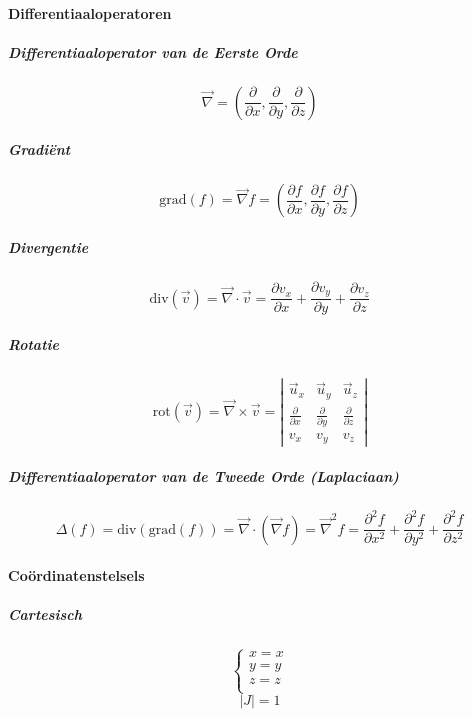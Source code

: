 \paragraph{Differentiaaloperatoren}
\label{sec:Differentiaaloperatoren}

\subparagraph{Differentiaaloperator van de Eerste Orde}
\label{sec:Differentiaaloperator1}
  \[
    \vec \nabla = \left(\frac{\partial}{\partial x},\frac{\partial}{\partial y},\frac{\partial}{\partial z}\right)
  \]

\subparagraph{Gradiënt}
\label{sec:Gradient}
  \[
    \mbox{grad}\left(f\right) = \vec \nabla f =  \left(\frac{\partial f}{\partial x},\frac{\partial f}{\partial y},\frac{\partial f}{\partial z}\right)
  \]

\subparagraph{Divergentie}
\label{sec:Divergentie}
  \[
    \mbox{div}\left(\vec v\right) = \vec \nabla \cdot \vec v = \frac{\partial v_x}{\partial x} + \frac{\partial v_y}{\partial y} + \frac{\partial v_z}{\partial z}
  \]

\subparagraph{Rotatie}
\label{sec:Rotatie}
  \[
    \mbox{rot}\left(\vec v\right) = \vec \nabla \times \vec v =
    \left|
     \begin{array}{ccc}
       \vec u_x  &  \vec u_y  &  \vec u_z \\
       \frac{\partial}{\partial x} & \frac{\partial}{\partial y} & \frac{\partial}{\partial z}\\
      v_x & v_y & v_z
     \end{array}
   \right|
  \]

\subparagraph{Differentiaaloperator van de Tweede Orde (Laplaciaan)}
\label{sec:Differentiaaloperator2}
  \[
    \Delta\left(f\right)=\mbox{div}\left(\mbox{grad}\left(f\right)\right)=
    \vec \nabla \cdot\left(\vec \nabla f\right) = \vec \nabla^2 f =
    \frac{\partial^2 f}{\partial x^2} + \frac{\partial^2 f}{\partial y^2} + \frac{\partial^2 f}{\partial z^2}
  \]

\paragraph{Coördinatenstelsels}
\label{sec:CoordStelsels}

\subparagraph{Cartesisch}
\[
  \left\{
    \begin{array}{l}
      x = x\\
      y = y\\
      z = z\\
    \end{array}
  \right.
\]
\[
  \left| J \right| = 1
\]

